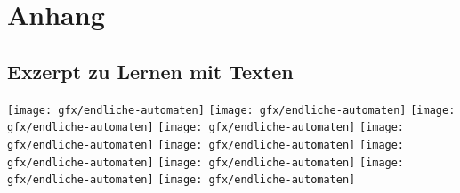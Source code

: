 %
\chapter{Anhang}
\label{sec:appendix}

\section{Exzerpt zu Lernen mit Texten}
\label{sec:appendix:sec1}

\texttt{[image: gfx/endliche-automaten]}
\clearpage
\texttt{[image: gfx/endliche-automaten]}
\clearpage
\texttt{[image: gfx/endliche-automaten]}
\clearpage
\texttt{[image: gfx/endliche-automaten]}
\clearpage
\texttt{[image: gfx/endliche-automaten]}
\clearpage
\texttt{[image: gfx/endliche-automaten]}
\clearpage
\texttt{[image: gfx/endliche-automaten]}
\clearpage
\texttt{[image: gfx/endliche-automaten]}
\clearpage
\texttt{[image: gfx/endliche-automaten]}
\clearpage
\texttt{[image: gfx/endliche-automaten]}